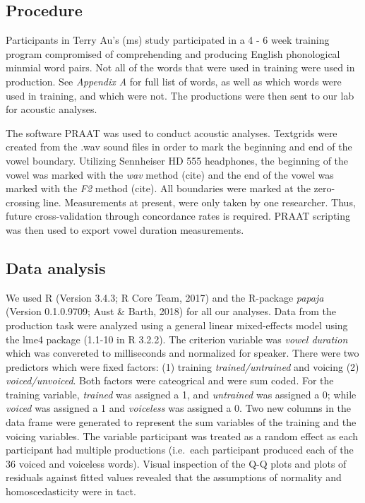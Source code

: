 \documentclass[man]{apa6}
\theoremstyle{definition}
\theoremstyle{definition}
\theoremstyle{definition}
\theoremstyle{remark}
\begin{document}
\subsection{Procedure}\label{procedure}

Participants in Terry Au's (ms) study participated in a 4 - 6 week
training program compromised of comprehending and producing English
phonological minmial word pairs. Not all of the words that were used in
training were used in production. See \emph{Appendix A} for full list of
words, as well as which words were used in training, and which were not.
The productions were then sent to our lab for acoustic analyses.

The software PRAAT was used to conduct acoustic analyses. Textgrids were
created from the .wav sound files in order to mark the beginning and end
of the vowel boundary. Utilizing Sennheiser HD 555 headphones, the
beginning of the vowel was marked with the \emph{wav} method (cite) and
the end of the vowel was marked with the \emph{F2} method (cite). All
boundaries were marked at the zero-crossing line. Measurements at
present, were only taken by one researcher. Thus, future
cross-validation through concordance rates is required. PRAAT scripting
was then used to export vowel duration measurements.

\subsection{Data analysis}\label{data-analysis}

We used R (Version 3.4.3; R Core Team, 2017) and the R-package
\emph{papaja} (Version 0.1.0.9709; Aust \& Barth, 2018) for all our
analyses. Data from the production task were analyzed using a general
linear mixed-effects model using the lme4 package (1.1-10 in R 3.2.2).
The criterion variable was \emph{vowel duration} which was convereted to
milliseconds and normalized for speaker. There were two predictors which
were fixed factors: (1) training \emph{trained/untrained} and voicing
(2) \emph{voiced/unvoiced}. Both factors were cateogrical and were sum
coded. For the training variable, \emph{trained} was assigned a 1, and
\emph{untrained} was assigned a 0; while \emph{voiced} was assigned a 1
and \emph{voiceless} was assigned a 0. Two new columns in the data frame
were generated to represent the sum variables of the training and the
voicing variables. The variable participant was treated as a random
effect as each participant had multiple productions (i.e.~each
participant produced each of the 36 voiced and voiceless words). Visual
inspection of the Q-Q plots and plots of residuals against fitted values
revealed that the assumptions of normality and homoscedasticity were in
tact.
\end{document}
